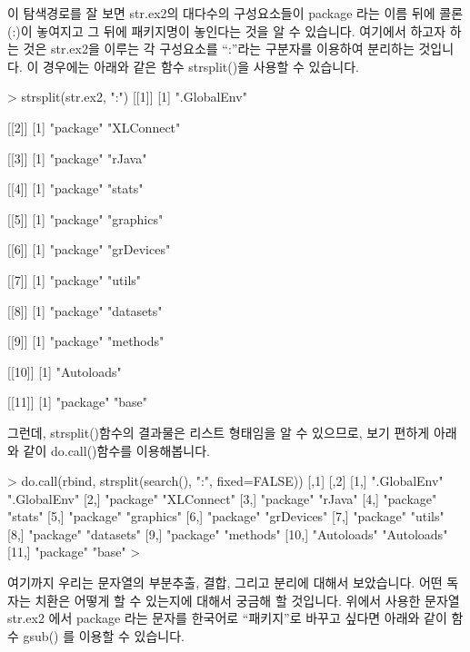 이 탐색경로를 잘 보면 str.ex2의 대다수의 구성요소들이 package 라는 이름 뒤에 콜론 (:)이 놓여지고 그 뒤에 패키지명이 놓인다는 것을 알 수 있습니다.
여기에서 하고자 하는 것은 str.ex2을 이루는 각 구성요소를 ``:''라는 구분자를 이용하여 분리하는 것입니다.
이 경우에는 아래와 같은 함수 strsplit()을 사용할 수 있습니다. 

\begin{Schunk}
\begin{Soutput} 
> strsplit(str.ex2, ":")
[[1]]
[1] ".GlobalEnv"

[[2]]
[1] "package"   "XLConnect"

[[3]]
[1] "package" "rJava"  

[[4]]
[1] "package" "stats"  

[[5]]
[1] "package"  "graphics"

[[6]]
[1] "package"   "grDevices"

[[7]]
[1] "package" "utils"  

[[8]]
[1] "package"  "datasets"

[[9]]
[1] "package" "methods"

[[10]]
[1] "Autoloads"

[[11]]
[1] "package" "base"   
\end{Soutput}
\end{Schunk}

그런데, strsplit()함수의 결과물은 리스트 형태임을 알 수 있으므로, 보기 편하게 아래와 같이 do.call()함수를 이용해봅니다. 

\begin{Schunk}
\begin{Soutput} 
> do.call(rbind, strsplit(search(), ":", fixed=FALSE))
      [,1]         [,2]        
 [1,] ".GlobalEnv" ".GlobalEnv"
 [2,] "package"    "XLConnect" 
 [3,] "package"    "rJava"     
 [4,] "package"    "stats"     
 [5,] "package"    "graphics"  
 [6,] "package"    "grDevices" 
 [7,] "package"    "utils"     
 [8,] "package"    "datasets"  
 [9,] "package"    "methods"   
[10,] "Autoloads"  "Autoloads" 
[11,] "package"    "base"      
> 
\end{Soutput}
\end{Schunk}

여기까지 우리는 문자열의 부분추출, 결합, 그리고 분리에 대해서 보았습니다.
어떤 독자는 치환은 어떻게 할 수 있는지에 대해서 궁금해 할 것입니다.
위에서 사용한 문자열 str.ex2 에서 package 라는 문자를 한국어로 ``패키지''로 바꾸고 싶다면 아래와 같이 함수 gsub() 를 이용할 수 있습니다. 

